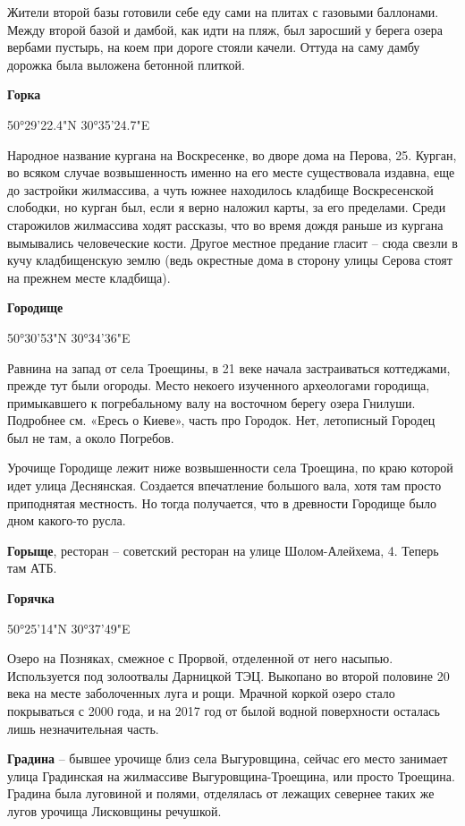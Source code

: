 Жители второй базы готовили себе еду сами на плитах с газовыми баллонами. Между второй базой и дамбой, как идти на пляж, был заросший у берега озера вербами пустырь, на коем при дороге стояли качели. Оттуда на саму дамбу дорожка была выложена бетонной плиткой.\\

\medskip

\textbf{Горка}

50°29'22.4"N 30°35'24.7"E

Народное название кургана на Воскресенке, во дворе дома на Перова, 25. Курган, во всяком случае возвышенность именно на его месте существовала издавна, еще до застройки жилмассива, а чуть южнее находилось кладбище Воскресенской слободки, но курган был, если я верно наложил карты, за его пределами. Среди старожилов жилмассива ходят рассказы, что во время дождя раньше из кургана вымывались человеческие кости. Другое местное предание гласит – сюда свезли в кучу кладбищенскую землю (ведь окрестные дома в сторону улицы Серова стоят на прежнем месте кладбища).\\

\medskip


\textbf{Городище}

50°30'53"N 30°34'36"E

Равнина на запад от села Троещины, в 21 веке начала застраиваться коттеджами, прежде тут были огороды. Место некоего изученного археологами городища, примыкавшего к погребальному валу на восточном берегу озера Гнилуши. Подробнее см. «Ересь о Киеве», часть про Городок. Нет, летописный Городец был не там, а около Погребов.

Урочище Городище лежит ниже возвышенности села Троещина, по краю которой идет улица Деснянская. Создается впечатление большого вала, хотя там просто приподнятая местность. Но тогда получается, что в древности Городище было дном какого-то русла.\\

\medskip

\textbf{Горыще}, ресторан – советский ресторан на улице Шолом-Алейхема, 4. Теперь там АТБ.\\

\medskip

\textbf{Горячка}

50°25'14"N 30°37'49"E

Озеро на Позняках, смежное с Прорвой, отделенной от него насыпью. Используется под золоотвалы Дарницкой ТЭЦ. Выкопано во второй половине 20 века на месте заболоченных луга и рощи. Мрачной коркой озеро стало покрываться с 2000 года, и на 2017 год от былой водной поверхности осталась лишь незначительная часть.\\

\medskip

\textbf{Градина} – бывшее урочище близ села Выгуровщина, сейчас его место занимает улица Градинская на жилмассиве Выгуровщина-Троещина, или просто Троещина. Градина была луговиной и полями, отделялась от лежащих севернее таких же лугов урочища Лисковщины речушкой.
